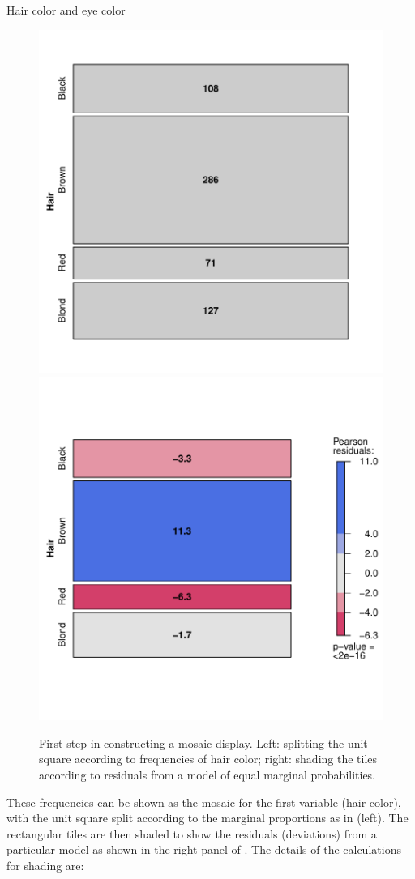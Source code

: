 \documentclass[11pt]{book}
\renewenvironment{knitrout}{\small\renewcommand{\baselinestretch}{.85}}{} %
\begin{document}
\begin{Example}[haireye2a]{Hair color and eye color}
\begin{knitrout}
\begin{figure}[!htbp]
\centerline{\includegraphics[width=.49\textwidth]{ch05/fig/haireye-mos41} 
\includegraphics[width=.49\textwidth]{ch05/fig/haireye-mos42} }

\caption[First step in constructing a mosaic display]{First step in constructing a mosaic display. Left: splitting the unit square according to frequencies of hair color; right: shading the tiles according to residuals from a model of equal marginal probabilities.\label{fig:haireye-mos4}}
\end{figure}


\end{knitrout}

These frequencies can be shown as the mosaic for the first variable (hair color),
with the unit square split according to the marginal proportions
as in  (left).
The rectangular tiles are then shaded to show the residuals (deviations)
from a particular model as shown in the right panel of .
The details of the calculations for shading are:


\end{Example}
\end{document}
